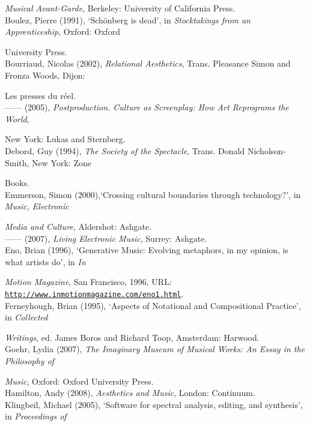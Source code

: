 \emph{Musical Avant-Garde}, Berkeley: University of California Press. 
\hypertarget{boulez}{}\\
Boulez, Pierre (1991), `Sch\"{o}nberg is dead', in \emph{Stocktakings from an Apprenticeship}, Oxford: Oxford 

University Press. 
\hypertarget{relational}{}\\
Bourriaud, Nicolas (2002), \emph{Relational Aesthetics}, Trans. Pleasance Simon and Fronza Woods, Dijon: 

Les presses du r\'{e}el.
\hypertarget{postproduction}{}\\
------ (2005),  \emph{Postproduction. Culture as Screenplay: How Art Reprograms the World}, 

New York: Lukas and Sternberg.
\hypertarget{debord}{}\\
Debord, Guy (1994), \emph{The Society of the Spectacle}, Trans. Donald Nicholson-Smith, New York: Zone 

Books.
\hypertarget{emmersoncross}{}\\
Emmerson, Simon (2000),`Crossing cultural boundaries through technology?',  in \emph{Music, Electronic}

\emph{Media and Culture}, Aldershot: Ashgate. 
\hypertarget{emmersonliving}{}\\
------ (2007), \emph{Living Electronic Music}, Surrey: Ashgate. 
\hypertarget{eno}{}\\
Eno, Brian (1996), `Generative Music: Evolving metaphors, in my opinion, is what artists do', in \emph{In}

\emph{Motion Magazine}, San Francisco, 1996, URL: \href{http://www.inmotionmagazine.com/eno1.html}{\texttt {http://www.inmotionmagazine.com/eno1.html}}.
\hypertarget{ferneyhough}{}\\
Ferneyhough, Brian (1995), `Aspects of Notational and Compositional Practice', in \emph{Collected}

\emph{Writings}, ed. James Boros and Richard Toop, Amsterdam: Harwood.
\hypertarget{goer}{}\\
Goehr, Lydia (2007), \emph{The Imaginary Museum of Musical Works: An Essay in the Philosophy of}

\emph{Music}, Oxford: Oxford University Press.
\hypertarget{hamilton}{}\\
Hamilton, Andy (2008), \emph{Aesthetics and Music}, London: Continuum. 
\hypertarget{klingbeil}{}\\
Klingbeil, Michael (2005), `Software for spectral analysis, editing, and synthesis', in \emph{Proceedings of}

